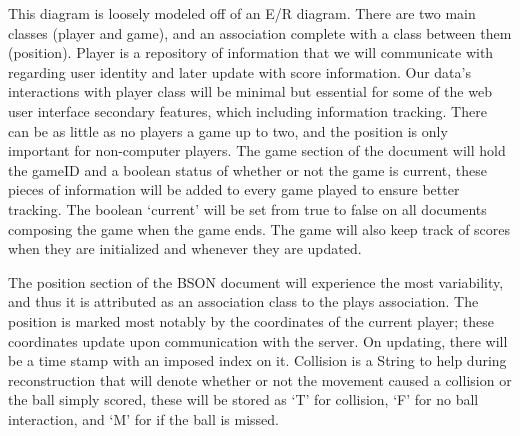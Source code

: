 \documentclass[letterpaper,12pt]{article}
\begin{document}
This diagram is loosely modeled off of an E/R diagram. There are two main classes (player and game), and an association complete with a class between them (position). Player is a repository of information that we will communicate with regarding user identity and later update with score information. Our data’s interactions with player class will be minimal but essential for some of the web user interface secondary features, which including information tracking. There can be as little as no players a game up to two, and the position is only important for non-computer players. The game section of the document will hold the gameID and a boolean status of whether or not the game is current, these pieces of information will be added to every game played to ensure better tracking. The boolean ‘current’ will be set from true to false on all documents composing the game when the game ends. The game will also keep track of scores when they are initialized and whenever they are updated.

The position section of the BSON document will experience the most variability, and thus it is attributed as an association class to the plays association. The position is marked most notably by the coordinates of the current player; these coordinates update upon communication with the server. On updating, there will be a time stamp with an imposed index on it. Collision is a String to help during reconstruction that will denote whether or not the movement caused a collision or the ball simply scored, these will be stored as ‘T’ for collision, ‘F’ for no ball interaction, and ‘M’ for if the ball is missed.
\end{document}

